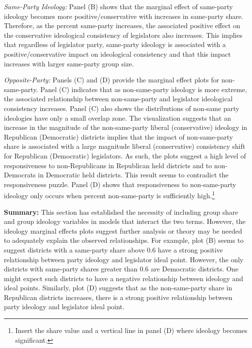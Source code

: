 \documentclass[10pt,letterpaper]{article}
\begin{document}
\textit{Same-Party Ideology:} Panel (B) shows that the marginal effect of same-party ideology becomes more positive/conservative with increases in same-party share. Therefore, as the percent same-party increases, the associated positive effect on the conservative ideological consistency of legislators also increases. This implies that regardless of legislator party, same-party ideology is associated with a positive/conservative impact on ideological consistency and that this impact increases with larger same-party group size.

\textit{Opposite-Party:} Panels (C) and (D) provide the marginal effect plots for non-same-party. Panel (C) indicates that as non-same-party ideology is more extreme, the associated relationship between non-same-party and legislator ideological consistency increases. Panel (C) also shows the distributions of non-same party ideologies have only a small overlap zone. The visualization suggests that an increase in the magnitude of the non-same-party liberal (conservative) ideology in Republican (Democratic) districts implies that the impact of non-same-party share is associated with a large magnitude liberal (conservative) consistency shift for Republican (Democratic) legislators. As such, the plots suggest a high level of responsiveness to non-Republicans in Republican held districts and to non-Democrats in Democratic held districts. This result seems to contradict the responsiveness puzzle. Panel (D) shows that responsiveness to non-same-party ideology only occurs when percent non-same-party is sufficiently high.\footnote{Insert the share value and a vertical line in panel (D) where ideology becomes significant.} 

\textbf{Summary:} This section has established the necessity of including group share and group ideology variables in models that interact the two terms. However, the ideology marginal effects plots suggest further analysis or theory may be needed to adequately explain the observed relationships. For example, plot (B) seems to suggest districts with a same-party share above 0.6 have a strong positive relationship between party ideology and legislator ideal point. However, the only districts with same-party shares greater than 0.6 are Democratic districts. One might expect such districts to have a negative relationship between ideology and ideal points. Similarly, plot (D) suggests that as the non-same-party share in Republican districts increases, there is a strong positive relationship between party ideology and legislator ideal point.
\end{document}
